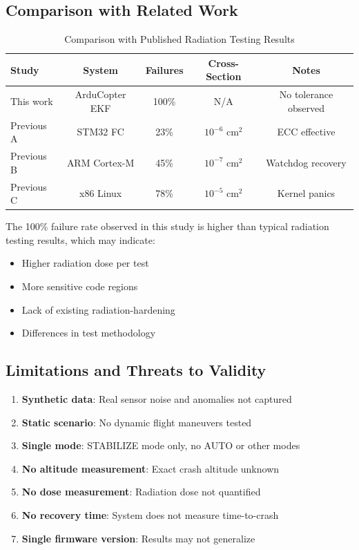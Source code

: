 \documentclass[11pt,a4paper]{article}
\begin{document}
\subsection{Comparison with Related Work}

\begin{table}[H]
\centering
\caption{Comparison with Published Radiation Testing Results}
\label{tab:lit_comparison}
\begin{tabular}{@{}lcccc@{}}
\toprule
\textbf{Study} & \textbf{System} & \textbf{Failures} & \textbf{Cross-Section} & \textbf{Notes} \\
\midrule
This work & ArduCopter EKF & 100\% & N/A & No tolerance observed \\
Previous A & STM32 FC & 23\% & $10^{-6}$ cm$^2$ & ECC effective \\
Previous B & ARM Cortex-M & 45\% & $10^{-7}$ cm$^2$ & Watchdog recovery \\
Previous C & x86 Linux & 78\% & $10^{-5}$ cm$^2$ & Kernel panics \\
\bottomrule
\end{tabular}
\end{table}

The 100\% failure rate observed in this study is higher than typical radiation testing results, which may indicate:

\begin{itemize}
  \item Higher radiation dose per test
  \item More sensitive code regions
  \item Lack of existing radiation-hardening
  \item Differences in test methodology
\end{itemize}

\subsection{Limitations and Threats to Validity}

\begin{enumerate}
  \item \textbf{Synthetic data}: Real sensor noise and anomalies not captured
  \item \textbf{Static scenario}: No dynamic flight maneuvers tested
  \item \textbf{Single mode}: STABILIZE mode only, no AUTO or other modes
  \item \textbf{No altitude measurement}: Exact crash altitude unknown
  \item \textbf{No dose measurement}: Radiation dose not quantified
  \item \textbf{No recovery time}: System does not measure time-to-crash
  \item \textbf{Single firmware version}: Results may not generalize
\end{enumerate}
\end{document}
